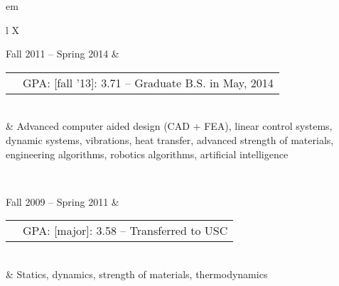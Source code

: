 

	
{ em
\begin{tabu}{ L{\tabularIndent} X } \hhline{==} 
	\hhline{==}
	
	Fall 2011 -- Spring 2014 & 
	\begin{tabular}{ l | l }
		\mysubsection{University of Southern California} & GPA: [fall '13]: 3.71 -- Graduate B.S. in May, 2014 \\ \cline{1-1}
	\end{tabular}
	\\
	&
	Advanced computer aided design (CAD + FEA), linear control systems, dynamic systems, vibrations, heat transfer, advanced strength of materials, engineering algorithms, robotics algorithms, artificial intelligence

\\ \hhline{==}

	Fall 2009 -- Spring 2011 & 
	\begin{tabular}{ l | l }
		\mysubsection{University of Massachusetts, Amherst} & GPA: [major]: 3.58 -- Transferred to USC \\ \cline{1-1}
	\end{tabular}
	\\
	& Statics, dynamics, strength of materials, thermodynamics
\end{tabu}}